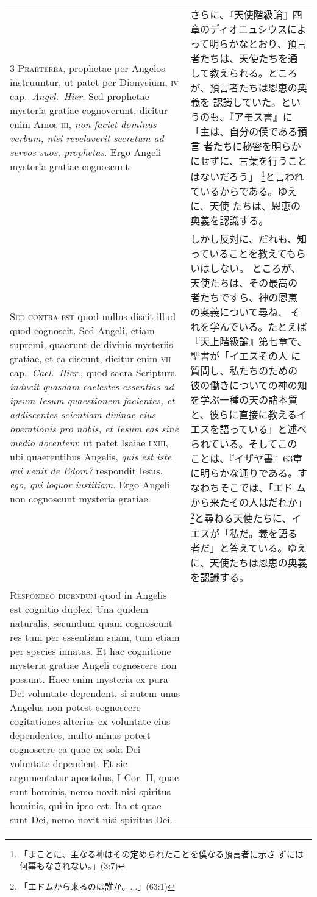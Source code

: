 \documentclass[10pt]{jsarticle} %
\begin{document}
\begin{longtable}{p{21em}p{21em}}
\\


{\scshape 3 Praeterea}, prophetae per Angelos
instruuntur, ut patet per Dionysium, {\scshape iv} cap.~{\itshape Angel.~Hier}. Sed prophetae
mysteria gratiae cognoverunt, dicitur enim Amos {\scshape iii}, {\itshape non faciet dominus
verbum, nisi revelaverit secretum ad servos suos, prophetas}. Ergo Angeli
mysteria gratiae cognoscunt.


&


さらに、『天使階級論』四章のディオニュシウスによって明らかなとおり、預言
 者たちは、天使たちを通して教えられる。ところが、預言者たちは恩恵の奥義を
 認識していた。というのも、『アモス書』に「主は、自分の僕である預言
 者たちに秘密を明らかにせずに、言葉を行うことはないだろう」
 \footnote{「まことに、主なる神はその定められたことを僕なる預言者に示さ
 ずには何事もなされない。」(3:7)}と言われているからである。ゆえに、天使
 たちは、恩恵の奥義を認識する。

\\


{\scshape Sed contra est} quod nullus discit illud quod
cognoscit. Sed Angeli, etiam supremi, quaerunt de divinis mysteriis
gratiae, et ea discunt, dicitur enim {\scshape vii} cap.~{\itshape Cael.~Hier}., quod sacra
Scriptura {\itshape inducit quasdam caelestes essentias ad ipsum Iesum quaestionem
facientes, et addiscentes scientiam divinae eius operationis pro nobis,
et Iesum eas sine medio docentem}; ut patet Isaiae {\scshape lxiii}, ubi
quaerentibus Angelis, {\itshape quis est iste qui venit de Edom?} respondit Iesus,
{\itshape ego, qui loquor iustitiam}. Ergo Angeli non cognoscunt mysteria gratiae.


&

しかし反対に、だれも、知っていることを教えてもらいはしない。
ところが、天使たちは、その最高の者たちですら、神の恩恵の奥義について尋ね、
 それを学んでいる。たとえば『天上階級論』第七章で、聖書が「イエスその人
 に質問し、私たちのための彼の働きについての神の知を学ぶ一種の天の諸本質
 と、彼らに直接に教えるイエスを語っている」と述べられている。そしてこの
 ことは、『イザヤ書』63章に明らかな通りである。すなわちそこでは、「エド
 ムから来たその人はだれか」\footnote{「エドムから来るのは誰か。...」(63:1)}と尋ねる天使たちに、イエスが「私だ。義を語る
 者だ」と答えている。ゆえに、天使たちは恩恵の奥義を認識する。


\\


{\scshape Respondeo dicendum} quod in Angelis est
cognitio duplex. Una quidem naturalis, secundum quam cognoscunt res tum
per essentiam suam, tum etiam per species innatas. Et hac cognitione
mysteria gratiae Angeli cognoscere non possunt. Haec enim mysteria ex
pura Dei voluntate dependent, si autem unus Angelus non potest
cognoscere cogitationes alterius ex voluntate eius dependentes, multo
minus potest cognoscere ea quae ex sola Dei voluntate dependent. Et sic
argumentatur apostolus, I Cor. II, quae sunt hominis, nemo novit nisi
spiritus hominis, qui in ipso est. Ita et quae sunt Dei, nemo novit nisi
spiritus Dei. 



\end{longtable}
\end{document}
